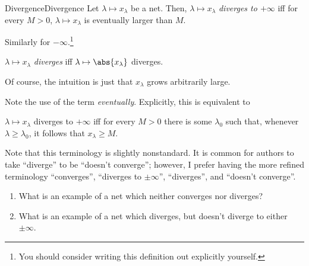\begin{dfn}{Divergence}{Divergence}
Let $\lambda \mapsto x_\lambda$ be a net.  Then, $\lambda \mapsto x_\lambda$ \emph{diverges to $+\infty$} iff for every $M>0$, $\lambda \mapsto x_{\lambda}$ is eventually larger than $M$.

Similarly for $-\infty$.\footnote{You should consider writing this definition out explicitly yourself.}

$\lambda \mapsto x_\lambda$ \emph{diverges} iff $\lambda \mapsto \abs{x_{\lambda}}$ diverges.
\begin{rmk}
Of course, the intuition is just that $x_\lambda$ grows arbitrarily large.
\end{rmk}
\begin{rmk}
Note the use of the term \emph{eventually}.  Explicitly, this is equivalent to
\begin{textequation}
$\lambda \mapsto x_{\lambda}$ diverges to $+\infty$ iff for every $M>0$ there is some $\lambda _0$ such that, whenever $\lambda \geq \lambda _0$, it follows that $x_{\lambda}\geq M$.
\end{textequation}
\end{rmk}
\begin{rmk}
Note that this terminology is slightly nonstandard.  It is common for authors to take ``diverge'' to be ``doesn't converge''; however, I prefer having the more refined terminology ``converges'', ``diverges to $\pm \infty$'', ``diverges'', and ``doesn't converge''.
\end{rmk}
\end{dfn}
\begin{exr}{}{}
\begin{enumerate}
\item What is an example of a net which neither converges nor diverges?
\item What is an example of a net which diverges, but doesn't diverge to either $\pm \infty$.
\end{enumerate}
\end{exr}

